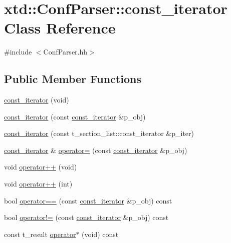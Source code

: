\hypertarget{classxtd_1_1ConfParser_1_1const__iterator}{}\section{xtd\+:\+:Conf\+Parser\+:\+:const\+\_\+iterator Class Reference}
\label{classxtd_1_1ConfParser_1_1const__iterator}


{\ttfamily \#include $<$Conf\+Parser.\+hh$>$}

\subsection*{Public Member Functions}
\begin{DoxyCompactItemize}
\item 
\hyperlink{classxtd_1_1ConfParser_1_1const__iterator_a9c17a000740a8558dddb0dd1187939b5}{const\+\_\+iterator} (void)
\item 
\hyperlink{classxtd_1_1ConfParser_1_1const__iterator_af09c45149cd53e97902123aa770c0867}{const\+\_\+iterator} (const \hyperlink{classxtd_1_1ConfParser_1_1const__iterator}{const\+\_\+iterator} \&p\+\_\+obj)
\item 
\hyperlink{classxtd_1_1ConfParser_1_1const__iterator_a0fb34a1a672ceecfc5eb756e712bb977}{const\+\_\+iterator} (const t\+\_\+section\+\_\+list\+::const\+\_\+iterator \&p\+\_\+iter)
\item 
\hyperlink{classxtd_1_1ConfParser_1_1const__iterator}{const\+\_\+iterator} \& \hyperlink{classxtd_1_1ConfParser_1_1const__iterator_acef9a9b328552d35dec3b1736d775cf5}{operator=} (const \hyperlink{classxtd_1_1ConfParser_1_1const__iterator}{const\+\_\+iterator} \&p\+\_\+obj)
\item 
void \hyperlink{classxtd_1_1ConfParser_1_1const__iterator_a6c3a5f37a31973077c3067a8d892aca0}{operator++} (void)
\item 
void \hyperlink{classxtd_1_1ConfParser_1_1const__iterator_a7c5bfdfc6f85ac43469fc6dcd8601b98}{operator++} (int)
\item 
bool \hyperlink{classxtd_1_1ConfParser_1_1const__iterator_a1acb3ce9b1fb4892d77dcd649ec7768a}{operator==} (const \hyperlink{classxtd_1_1ConfParser_1_1const__iterator}{const\+\_\+iterator} \&p\+\_\+obj) const 
\item 
bool \hyperlink{classxtd_1_1ConfParser_1_1const__iterator_a380f55fdaee860e5cc7c4f8fcfade27b}{operator!=} (const \hyperlink{classxtd_1_1ConfParser_1_1const__iterator}{const\+\_\+iterator} \&p\+\_\+obj) const 
\item 
const t\+\_\+result \hyperlink{classxtd_1_1ConfParser_1_1const__iterator_ab148b39b2f0e83242aeae432814eae7d}{operator$\ast$} (void) const 
\end{DoxyCompactItemize}



